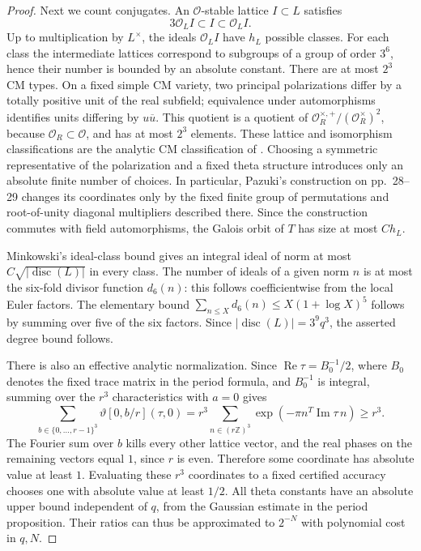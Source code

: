 \documentclass[11pt]{article}
\theoremstyle{definition}
\theoremstyle{remark}
\begin{document}
\begin{proof}
Next we count conjugates. An \(\mathcal O\)-stable lattice \(I\subset L\)
satisfies
\[
 3\mathcal O_L I\subset I\subset\mathcal O_L I.
\]
Up to multiplication by \(L^\times\), the ideals \(\mathcal O_LI\)
have \(h_L\) possible classes. For each class the intermediate
lattices correspond to subgroups of a group of order \(3^6\), hence
their number is bounded by an absolute constant. There are at most
\(2^3\) CM types. On a fixed simple CM variety, two principal
polarizations differ by a totally positive unit of the real subfield;
equivalence under automorphisms identifies units differing by
\(u\overline u\). This quotient is a quotient of
\(\mathcal O_R^{\times,+}/(\mathcal O_R^\times)^2\), because
\(\mathcal O_R\subset\mathcal O\), and has at most \(2^3\) elements.
These lattice and isomorphism classifications are the analytic CM
classification of \citet[Section~3, pp.~29--31]{MilneCM2020}.
Choosing a symmetric representative of the polarization and a fixed
theta structure introduces only an absolute finite number of choices.
In particular, Pazuki's construction on pp.~28--29 changes its
coordinates only by the fixed finite group of permutations and
root-of-unity diagonal multipliers described there. Since the
construction commutes with field automorphisms, the Galois orbit of
\(T\) has size at most \(C h_L\).

Minkowski's ideal-class bound gives an integral ideal of norm at most
\(C\sqrt{|\operatorname{disc}(L)|}\) in every class. The number of
ideals of a given norm \(n\) is at most the six-fold divisor function
\(d_6(n)\): this follows coefficientwise from the local Euler factors.
The elementary bound
\(\sum_{n\leq X}d_6(n)\leq X(1+\log X)^5\)
follows by summing over five of the six factors. Since
\(|\operatorname{disc}(L)|=3^9q^3\), the asserted degree bound follows.

There is also an effective analytic normalization. Since
\(\operatorname{Re}\tau=B_0^{-1}/2\), where \(B_0\) denotes the
fixed trace matrix in the period formula, and \(B_0^{-1}\) is integral,
summing over the \(r^3\) characteristics with
\(a=0\) gives
\[
 \sum_{b\in\{0,\ldots,r-1\}^3}\vartheta[0,b/r](\tau,0)
 =r^3\sum_{n\in(r\mathbb Z)^3}
       \exp(-\pi n^T\operatorname{Im}\tau\,n)\geq r^3.
\]
The Fourier sum over \(b\) kills every other lattice vector, and the
real phases on the remaining vectors equal \(1\), since \(r\) is even.
Therefore some coordinate has absolute value at least \(1\).
Evaluating these \(r^3\)
coordinates to a fixed certified accuracy chooses one with absolute
value at least \(1/2\). All theta constants have an absolute upper
bound independent of \(q\), from the Gaussian estimate in the period
proposition. Their ratios can thus be approximated to \(2^{-N}\)
with polynomial cost in \(q,N\).


\end{proof}
\end{document}
